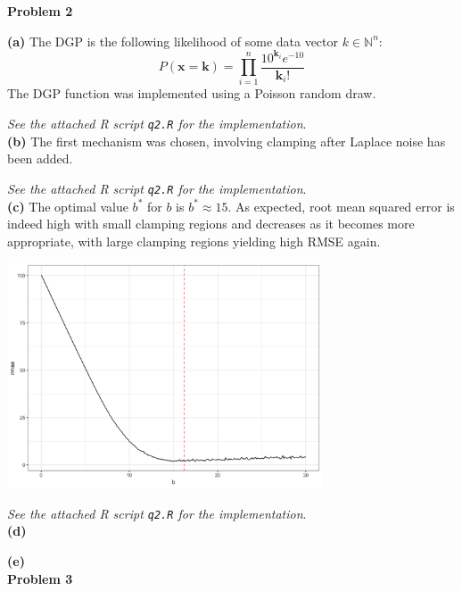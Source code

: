 \documentclass[12pt]{article}
\begin{document}
{\large\textbf{Problem 2}}

\textbf{(a)} The DGP is the following likelihood of some data vector $k\in\mathbb{N}^n$:
\[P(\mathbf{x} = \mathbf{k}) = \prod\limits^n_{i=1} \dfrac{10^{\mathbf{k}_i}e^{-10}}{\mathbf{k}_i!}\]
The DGP function was implemented using a Poisson random draw.

\emph{See the attached R script \texttt{q2.R} for the implementation}.\\

\textbf{(b)} The first mechanism was chosen, involving clamping after Laplace noise has been added.

\emph{See the attached R script \texttt{q2.R} for the implementation}.\\

\textbf{(c)} The optimal value $b^*$ for $b$ is $\boxed{b^* \approx 15}$. As expected, root mean squared error is indeed high with small clamping regions and decreases as it becomes more appropriate, with large clamping regions yielding high RMSE again.

\begin{center}
\includegraphics[width=0.7\textwidth]{clamping}
\end{center}

\emph{See the attached R script \texttt{q2.R} for the implementation}.\\

\textbf{(d)}

\textbf{(e)}\\

{\large\textbf{Problem 3}}
\end{document}
